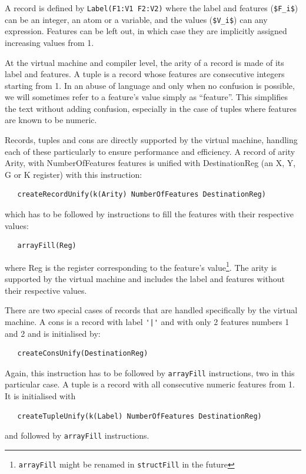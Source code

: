 \documentclass[a4paper]{memoir}
\begin{document}
A record is defined by \lstinline!Label(F1:V1 F2:V2)! where the label and features
(\lstinline[mathescape]!$F_i$!) can be an integer, an atom or a variable, and the values
(\lstinline[mathescape]!$V_i$!) can any expression. Features can be left out, in which case they are implicitly assigned increasing values from 1.

At the virtual machine and compiler level, the arity of a record is made of its
label and features.
A tuple is a record whose features are consecutive integers starting from 1. 
In an abuse of language and only when no confusion is possible, we will
sometimes refer to a feature's value simply as ``feature''. This simplifies the
text without adding confusion, especially in the case of tuples where features
are known to be numeric.

Records, tuples and cons are directly supported by the virtual machine, handling each of these particularly to ensure performance and efficiency.
A record of arity Arity, with NumberOfFeatures features is unified with 
DestinationReg (an X, Y, G or K register) with this instruction:
\begin{lstlisting}
   createRecordUnify(k(Arity) NumberOfFeatures DestinationReg)
\end{lstlisting}
which has to be followed by instructions to fill the features with their respective values:
\begin{lstlisting}
   arrayFill(Reg)
\end{lstlisting}
where Reg is the register corresponding to the feature's value\footnote{\lstinline!arrayFill! might be renamed in \lstinline!structFill! in the future}.
The arity is supported by the virtual machine and includes the label and features without their respective values.

There are two special cases of records that are handled specifically by the virtual machine.
A cons is a record with label \lstinline!'|'! and with only 2 features numbers 1
and 2 and is initialised by:
\begin{lstlisting}
   createConsUnify(DestinationReg)
\end{lstlisting}
Again, this instruction has to be
followed by \lstinline!arrayFill! instructions, two in this particular case.
A tuple is a record with all consecutive numeric features from 1. It is initialised with 
\begin{lstlisting}
   createTupleUnify(k(Label) NumberOfFeatures DestinationReg)
\end{lstlisting}
and followed by \lstinline!arrayFill! instructions.
\end{document}
